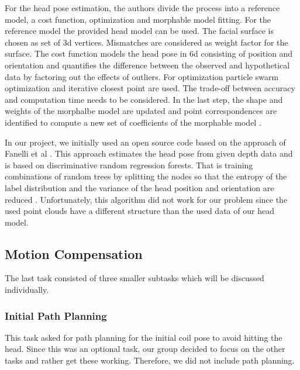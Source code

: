 \documentclass[conference]{IEEEtran}
\begin{document}
For the head pose estimation, the authors divide the process into a reference model, a cost function, optimization and morphable model fitting. For the reference model the provided head model can be used. The facial surface is chosen as set of 3d vertices. Mismatches are considered as weight factor for the surface. The cost function models the head pose in 6d consisting of position and orientation and quantifies the difference between the observed and hypothetical data by factoring out the effects of outliers. For optimization particle swarm optimization and iterative closest point are used. The trade-off between accuracy and computation time needs to be considered. In the last step, the shape and weights of the morphalbe model are updated and point correspondences are identified to compute a new set of coefficients of the morphable model \cite{headtracking}.

In our project, we initially used an open source code based on the approach of Fanelli et al \cite{head_pose_estimation}.
This approach estimates the head pose from given depth data and is based on discriminative random regression forests. That is training combinations of random trees by splitting the nodes so that the entropy of the label distribution and the variance of the head position and orientation are reduced \cite{head_pose_estimation}.
Unfortunately, this algorithm did not work for our problem since the used point clouds have a different structure than the used data of our head model.


\subsection{Motion Compensation}
The last task consisted of three smaller subtasks which will be discussed individually.
\subsubsection{Initial Path Planning}
This task asked for path planning for the initial coil pose to avoid hitting the head. Since this was an optional task, our group decided to focus on the other tasks and rather get these working. Therefore, we did not include path planning.
\end{document}
